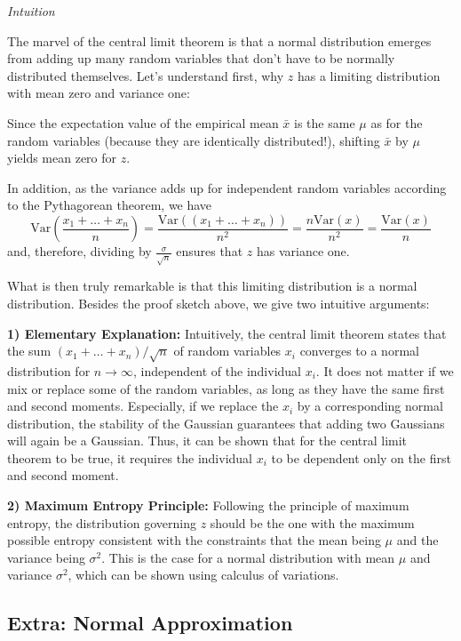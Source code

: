 \documentclass{notebook}
\begin{document}
\textit{Intuition}

The marvel of the central limit theorem is that a normal distribution emerges from adding up many random variables that don't have to be normally distributed themselves. Let's understand first, why $z$ has a limiting distribution with mean zero and variance one: 

Since the expectation value of the empirical mean $\bar{x}$ is the same $\mu$ as for the random variables (because they are identically distributed!), shifting $\bar{x}$ by $\mu$ yields mean zero for $z$.

In addition, as the variance adds up for independent random variables according to the Pythagorean theorem, we have 
%
\begin{equation}
\text{Var}\left(\frac{x_1 + \dots + x_n}{n}\right) = \frac{\text{Var}((x_1 + \dots + x_n))}{n^2} = \frac{n \text{Var}(x)}{n^2} = \frac{\text{Var}(x)}{n}
\end{equation}
%
and, therefore, dividing by $\frac{\sigma}{\sqrt{n}}$ ensures that $z$ has variance one.

What is then truly remarkable is that this limiting distribution is a normal distribution. Besides the proof sketch above, we give two intuitive arguments:

\textbf{1) Elementary Explanation:} Intuitively, the central limit theorem states that the sum $(x_1 + \dots + x_n)/\sqrt{n}$ of random variables $x_i$ converges to a normal distribution for $n \to \infty$, independent of the individual $x_i$. It does not matter if we mix or replace some of the random variables, as long as they have the same first and second moments. Especially, if we replace the $x_i$ by a corresponding normal distribution, the stability of the Gaussian guarantees that adding two Gaussians will again be a Gaussian. Thus, it can be shown that for the central limit theorem to be true, it requires the individual $x_i$ to be dependent only on the first and second moment.

\textbf{2) Maximum Entropy Principle:} Following the principle of maximum entropy, the distribution governing $z$ should be the one with the maximum possible entropy consistent with the constraints that the mean being $\mu$ and the variance being $\sigma^2$. This is the case for a normal distribution with mean $\mu$ and variance $\sigma^2$, which can be shown using calculus of variations. 

\subsection*{Extra: Normal Approximation}
\end{document}

